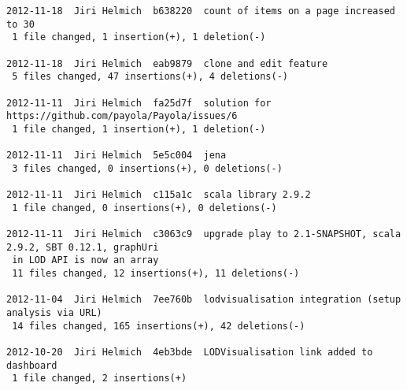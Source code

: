 {\begin{verbatim}
2012-11-18  Jiri Helmich  b638220  count of items on a page increased to 30
 1 file changed, 1 insertion(+), 1 deletion(-)

2012-11-18  Jiri Helmich  eab9879  clone and edit feature
 5 files changed, 47 insertions(+), 4 deletions(-)

2012-11-11  Jiri Helmich  fa25d7f  solution for https://github.com/payola/Payola/issues/6
 1 file changed, 1 insertion(+), 1 deletion(-)

2012-11-11  Jiri Helmich  5e5c004  jena
 3 files changed, 0 insertions(+), 0 deletions(-)

2012-11-11  Jiri Helmich  c115a1c  scala library 2.9.2
 1 file changed, 0 insertions(+), 0 deletions(-)

2012-11-11  Jiri Helmich  c3063c9  upgrade play to 2.1-SNAPSHOT, scala 2.9.2, SBT 0.12.1, graphUri
 in LOD API is now an array
 11 files changed, 12 insertions(+), 11 deletions(-)

2012-11-04  Jiri Helmich  7ee760b  lodvisualisation integration (setup analysis via URL)
 14 files changed, 165 insertions(+), 42 deletions(-)

2012-10-20  Jiri Helmich  4eb3bde  LODVisualisation link added to dashboard
 1 file changed, 2 insertions(+)
 \end{verbatim}
}